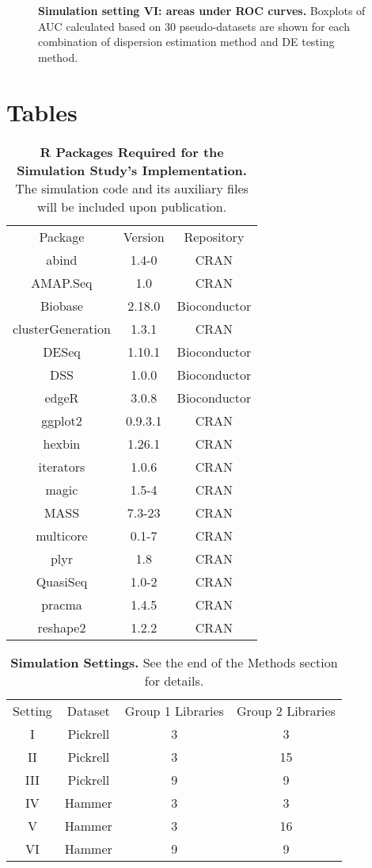 \documentclass[10pt]{article}
\begin{document}
\begin{figure}[!ht] %
   \centering
   \caption{{\bf Simulation setting VI: areas under ROC curves.} Boxplots of AUC calculated based on 30 pseudo-datasets are shown for each combination of dispersion estimation method and DE testing method.}
   \label{fig:auc6}
\end{figure}


\clearpage

\section*{Tables}


\begin{table}[!ht] %
   \centering
   \caption{{\bf R Packages Required for the Simulation Study's Implementation.} The simulation code and its auxiliary files will be included upon publication.}
\begin{tabular}{|c|c|c|}
Package & Version & Repository \\
  abind & 1.4-0 &CRAN\\
  AMAP.Seq & 1.0 &CRAN\\
  Biobase & 2.18.0 &Bioconductor\\
  clusterGeneration & 1.3.1 &CRAN\\
  DESeq & 1.10.1 &Bioconductor\\
  DSS & 1.0.0 &Bioconductor\\
  edgeR & 3.0.8 &Bioconductor\\
  ggplot2 & 0.9.3.1 &CRAN\\
  hexbin & 1.26.1 &CRAN\\
  iterators & 1.0.6 &CRAN\\
  magic & 1.5-4 &CRAN\\
  MASS & 7.3-23 &CRAN\\
  multicore & 0.1-7 &CRAN\\
  plyr & 1.8 &CRAN\\
  QuasiSeq & 1.0-2 &CRAN\\
  pracma & 1.4.5 &CRAN\\
  reshape2 & 1.2.2 &CRAN\\
\end{tabular}
\label{tab:software}
\end{table}

\begin{table}[!ht] %
   \centering
   \caption{{\bf Simulation Settings.} See the end of the Methods section for details.}
\begin{tabular}{|c|c|c|c|}
Setting & Dataset & Group 1 Libraries & Group 2 Libraries \\
I & Pickrell & 3 & 3 \\
II & Pickrell & 3 & 15 \\
III & Pickrell & 9 & 9 \\
IV & Hammer & 3 & 3 \\
V & Hammer & 3 & 16 \\
VI & Hammer & 9 & 9 \\
\end{tabular}
   \label{tab:simset}
\end{table}
\end{document}
